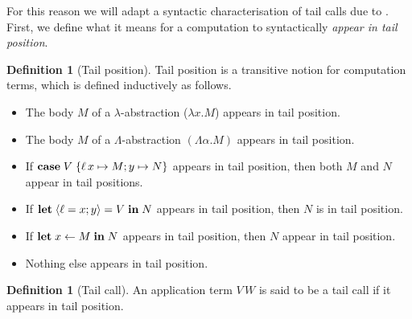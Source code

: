 \documentclass[12pt,phd,lfcs,twoside,openright,logo,leftchapter,normalheadings]{infthesis}
\theoremstyle{plain}
\theoremstyle{definition}
\newtheorem{definition}[theorem]{Definition}
\begin{document}
For this reason we will adapt a syntactic characterisation of tail
calls due to \citet{Clinger98}. First, we define what it means for a
computation to syntactically \emph{appear in tail position}.
%
\begin{definition}[Tail position]\label{def:tail-comp}
  Tail position is a transitive notion for computation terms, which is
  defined inductively as follows.
  \begin{itemize}
    \item The body $M$ of a $\lambda$-abstraction ($\lambda x. M$) appears in
      tail position.
    \item The body $M$ of a $\Lambda$-abstraction $(\Lambda \alpha.M)$
      appears in tail position.
    \item If $\mathbf{case}\;V\;\{\ell\,x \mapsto M; y \mapsto N\}$ appears in tail
      position, then both $M$ and $N$ appear in tail positions.
    \item If $\mathbf{let}\;\langle \ell = x; y \rangle = V \;\mathbf{in}\;N$ appears in tail
      position, then $N$ is in tail position.
    \item If $\mathbf{let}\;x \leftarrow M\;\mathbf{in}\;N$ appears in tail position, then
      $N$ appear in tail position.
    \item Nothing else appears in tail position.
  \end{itemize}
\end{definition}
%
\begin{definition}[Tail call]\label{def:tail-call}
  An application term $V\,W$ is said to be a tail call if it appears
  in tail position.
\end{definition}
%
%
\end{document}
